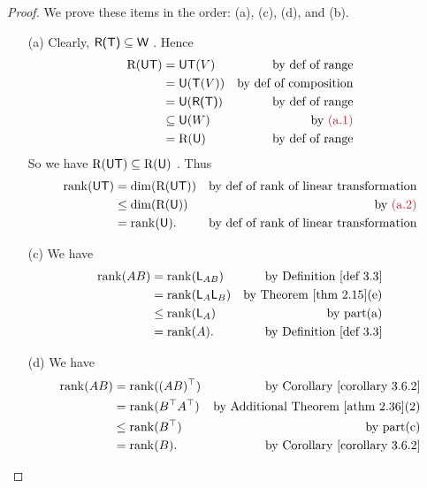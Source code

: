 \begin{proof}
We prove these items in the order: (a), (c), (d), and (b).
\begin{enumerate}
\item[(a)] Clearly, \(\textsf{R(T)} \subseteq \textsf{W}\) .
Hence
\begin{align*}
    \RANGE(\U\T) & = \U\T(V) & \text{by def of range} \\
                 & = \U(\T(V)) & \text{by def of composition} \\
                 & = \U(\RANGET) & \text{by def of range} \\
                 & \subseteq \U(W) & \text{by \MAROON{(a.1)}} \\
                 & = \RANGE(\U) & \text{by def of range}
\end{align*}
So we have \(\mathrm{R}(\textsf{U}\textsf{T}) \subseteq \mathrm{R}(\textsf{U})\) .
Thus
\begin{align*}
    \rank(\U\T) & = \dim(\RANGE(\U\T)) & \text{by def of rank of \LTRAN{}} \\
                & \le \dim(\RANGE(\U)) & \text{by \MAROON{(a.2)}} \\
                & = \rank(\U). & \text{by def of rank of \LTRAN{}}
\end{align*}

\item[(c)] We have
\begin{align*}
    \rank(AB) & = \rank(\LMTRAN_{AB}) & \text{by \DEF{3.3}} \\
              & = \rank(\LMTRAN_A \LMTRAN_B) & \text{by \THM{2.15}(e)} \\
              & \le \rank(\LMTRAN_A) & \text{by part(a)} \\
              & = \rank(A). & \text{by \DEF{3.3}}
\end{align*}

\item[(d)] We have
\begin{align*}
    \rank(AB) & = \rank((AB)^\top) & \text{by \CORO{3.6.2}} \\
              & = \rank(B^\top A^\top) & \text{by \ATHM{2.36}(2)} \\
              & \le \rank(B^\top) & \text{by part(c)} \\
              & = \rank(B). & \text{by \CORO{3.6.2}}
\end{align*}


\end{enumerate}
\end{proof}
